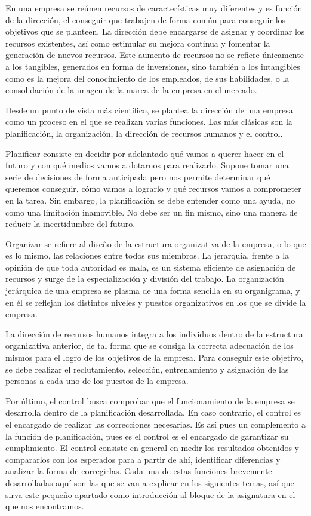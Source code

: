 \documentclass[
]{krantz}
\begin{document}
En una empresa se reúnen recursos de características muy diferentes y es función de la dirección, el conseguir que trabajen de forma común para conseguir los objetivos que se planteen. La dirección debe encargarse de asignar y coordinar los recursos existentes, así como estimular su mejora continua y fomentar la generación de nuevos recursos. Este aumento de recursos no se refiere únicamente a los tangibles, generados en forma de inversiones, sino también a los intangibles como es la mejora del conocimiento de los empleados, de sus habilidades, o la consolidación de la imagen de la marca de la empresa en el mercado.

Desde un punto de vista más científico, se plantea la dirección de una empresa como un proceso en el que se realizan varias funciones. Las más clásicas son la planificación, la organización, la dirección de recursos humanos y el control.

Planificar consiste en decidir por adelantado qué vamos a querer hacer en el futuro y con qué medios vamos a dotarnos para realizarlo. Supone tomar una serie de decisiones de forma anticipada pero nos permite determinar qué queremos conseguir, cómo vamos a lograrlo y qué recursos vamos a comprometer en la tarea. Sin embargo, la planificación se debe entender como una ayuda, no como una limitación inamovible. No debe ser un fin mismo, sino una manera de reducir la incertidumbre del futuro.

Organizar se refiere al diseño de la estructura organizativa de la empresa, o lo que es lo mismo, las relaciones entre todos sus miembros. La jerarquía, frente a la opinión de que toda autoridad es mala, es un sistema eficiente de asignación de recursos y surge de la especialización y división del trabajo. La organización jerárquica de una empresa se plasma de una forma sencilla en su organigrama, y en él se reflejan los distintos niveles y puestos organizativos en los que se divide la empresa.

La dirección de recursos humanos integra a los individuos dentro de la estructura organizativa anterior, de tal forma que se consiga la correcta adecuación de los mismos para el logro de los objetivos de la empresa. Para conseguir este objetivo, se debe realizar el reclutamiento, selección, entrenamiento y asignación de las personas a cada uno de los puestos de la empresa.

Por último, el control busca comprobar que el funcionamiento de la empresa se desarrolla dentro de la planificación desarrollada. En caso contrario, el control es el encargado de realizar las correcciones necesarias. Es así pues un complemento a la función de planificación, pues es el control es el encargado de garantizar su cumplimiento. El control consiste en general en medir los resultados obtenidos y compararlos con los esperados para a partir de ahí, identificar diferencias y analizar la forma de corregirlas.
Cada una de estas funciones brevemente desarrolladas aquí son las que se van a explicar en los siguientes temas, así que sirva este pequeño apartado como introducción al bloque de la asignatura en el que nos encontramos.
\end{document}
